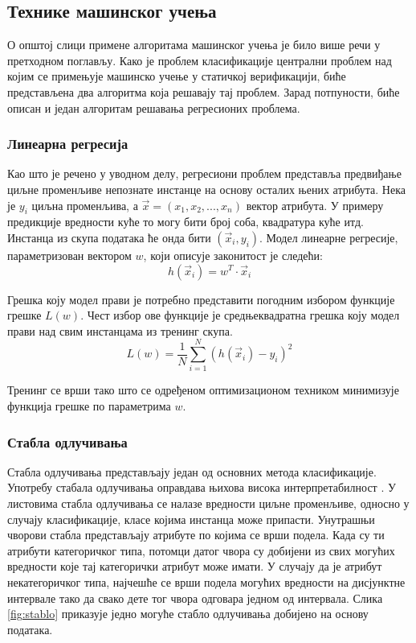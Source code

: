 \documentclass[a4paper]{article}
\begin{document}
{\subsection{Технике машинског учења}
О општој слици примене алгоритама машинског учења је било више речи у претходном поглављу. Како је проблем класификације централни проблем над којим се примењује машинско учење у статичкој верификацији, биће представљена два алгоритма која решавају тај проблем. Зарад потпуности, биће описан и један алгоритам решавања регресионих проблема.


\subsubsection*{Линеарна регресија}
Као што је речено у уводном делу, регресиони проблем представља предвиђање циљне променљиве непознате инстанце на основу осталих њених атрибута. Нека је $y_i$ циљна променљива, а $\vec{x} = (x_1, x_2, ..., x_n)$ вектор атрибута. У примеру предикције вредности куће то могу бити број соба, квадратура куће итд. Инстанца из скупа података ће онда бити $(\vec{x}_i, y_i)$. Модел линеарне регресије, параметризован вектором $w$, који описује законитост је следећи:
\begin{equation}
    h(\vec{x}_i) = w^T \cdot \vec{x}_i
\end{equation}


Грешка коју модел прави је потребно представити погодним избором функције грешке $L(w)$. Чест избор ове функције је средњеквадратна грешка коју модел прави над свим инстанцама из тренинг скупа.
\begin{equation}
L(w) = \frac{1}{N}\sum \limits_{i=1}^{N} (h(\vec{x}_i) - y_i)^2
\end{equation}

Тренинг се врши тако што се одређеном оптимизационом техником минимизује функција грешке по параметрима $w$.


\subsubsection*{Стабла одлучивања}
Стабла одлучивања представљају један од основних метода класификације. Употребу стабала одлучивања оправдава њихова висока интерпретабилност \cite{dct-survey}. У листовима стабла одлучивања се налазе вредности циљне променљиве, односно у случају класификације, класе којима инстанца може припасти. Унутрашњи чворови стабла представљају атрибуте по којима се врши подела. Када су ти атрибути категоричког типа, потомци датог чвора су добијени из свих могућих вредности које тај категорички атрибут може имати. У случају да је атрибут некатегоричког типа, најчешће се врши подела могућих вредности на дисјунктне интервале тако да свако дете тог чвора одговара једном од интервала. Слика \ref{fig:stablo} приказује једно могуће стабло одлучивања добијено на основу података.

}
\end{document}
